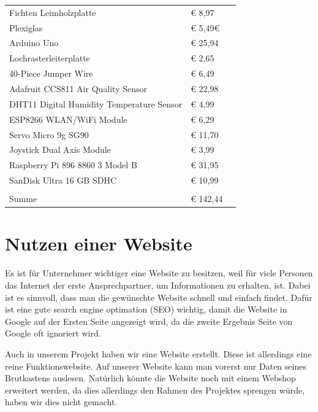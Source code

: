 	\centering
\newline
\caption{Kostenrechnung}
\label{KORE}
\begin{table}[h]
	\begin{tabular}{lll}
		Fichten	Leimholzplatte						 & € 8,97 		                  \\
		Plexiglas                   				 & € 5,49€                        \\
		Arduino Uno							    	 & € 25,94                        \\
		Lochrasterleiterplatte		                 & € 2,65                   	  \\
		40-Piece Jumper Wire 						 & € 6,49						  \\
		Adafruit CCS811 Air Quality Sensor     		 & € 22,98                        \\
		DHT11 Digital Humidity Temperature Sensor    & € 4,99                         \\
		ESP8266 WLAN/WiFi Module		             & € 6,29                         \\
		Servo Micro 9g SG90 						 & € 11,70   					  \\
		Joystick Dual Axis Module                    & € 3,99                  		  \\
		Raspberry Pi 896 8860 3 Model B  			 & € 31,95					      \\
		SanDisk Ultra 16 GB SDHC          			 & € 10,99                        \\
		\\
		Summe										 & € 142,44						  \\
	\end{tabular}
\end{table}



\newpage
\def \currentAuthor {Florian Tipotsch}
\section{Nutzen einer Website}
Es ist für Unternehmer wichtiger eine Website zu besitzen, weil für viele Personen das Internet der erste Ansprechpartner, um Informationen zu erhalten, ist. Dabei ist es sinnvoll, dass man die gewünschte Website schnell und einfach findet. Dafür ist eine gute search engine optimation (SEO) wichtig, damit die Website in Google auf der Ersten Seite angezeigt wird, da die zweite Ergebnis Seite von Google oft ignoriert wird.

Auch in unserem Projekt haben wir eine Website erstellt. Diese ist allerdings eine reine Funktionswebsite. Auf unserer Website kann man vorerst nur Daten seines Brutkastens auslesen. Natürlich könnte die Website noch mit einem Webshop erweitert werden, da dies allerdings den Rahmen des Projektes sprengen würde, haben wir dies nicht gemacht.


